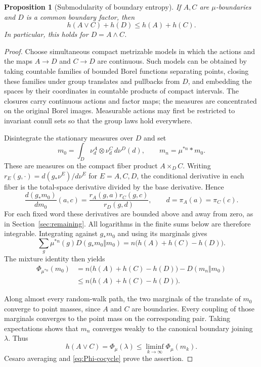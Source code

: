 \documentclass[11pt,letterpaper]{amsart}
\newtheorem{proposition}[theorem]{Proposition}
\theoremstyle{definition}
\theoremstyle{remark}
\numberwithin{equation}{section}
\begin{document}
\begin{proposition}[Submodularity of boundary entropy]
\label{prop:boundary-submodularity}
If $A,C$ are $\mu$-boundaries and $D$ is a common boundary factor, then
\[
 h(A\vee C)+h(D)\le h(A)+h(C).
\]
In particular, this holds for $D=A\wedge C$.
\end{proposition}
\begin{proof}
Choose simultaneous compact metrizable models in which the actions and
the maps $A\to D$ and $C\to D$ are continuous. Such models can be
obtained by taking countable families of bounded Borel functions
separating points, closing these families under group translates and
pullbacks from $D$, and embedding the spaces by their coordinates in
countable products of compact intervals. The closures carry continuous
actions and factor maps; the measures are concentrated on the original
Borel images. Measurable actions may first be restricted to invariant
conull sets so that the group laws hold everywhere.

Disintegrate the stationary measures over $D$ and set
\[
 m_0=\int_D\nu^A_d\otimes\nu^C_d\,d\nu^D(d),
 \qquad m_n=\mu^{*n}*m_0.
\]
These are measures on the compact fiber product $A\times_D C$.
Writing $r_E(g,\cdot)=d(g_*\nu^E)/d\nu^E$ for $E=A,C,D$,
the conditional derivative in each fiber is the total-space derivative
divided by the base derivative. Hence
\[
 \frac{d(g_*m_0)}{dm_0}(a,c)
 =\frac{r_A(g,a)r_C(g,c)}{r_D(g,d)},
 \qquad d=\pi_A(a)=\pi_C(c).
\]
For each fixed word these derivatives are bounded above and away from
zero, as in Section~\ref{sec:remaining}. All logarithms in the finite
sums below are therefore integrable. Integrating against $g_*m_0$
and using its marginals gives
\[
 \sum_g\mu^{*n}(g)D(g_*m_0\Vert m_0)
 =n\bigl(h(A)+h(C)-h(D)\bigr).
\]
The mixture identity then yields
\begin{align*}
 \Phi_{\mu^{*n}}(m_0)
 &=n\bigl(h(A)+h(C)-h(D)\bigr)-D(m_n\Vert m_0)\\
 &\le n\bigl(h(A)+h(C)-h(D)\bigr).
\end{align*}

Along almost every random-walk path, the two marginals of the translate
of $m_0$ converge to point masses, since $A$ and $C$ are boundaries.
Every coupling of those marginals converges to the point mass on the
corresponding pair. Taking expectations shows that $m_n$ converges
weakly to the canonical boundary joining $\lambda$. Thus
\[
 h(A\vee C)=\Phi_\mu(\lambda)
 \le\liminf_{k\to\infty}\Phi_\mu(m_k).
\]
Cesaro averaging and \eqref{eq:Phi-cocycle} prove the assertion.
\end{proof}
\end{document}
